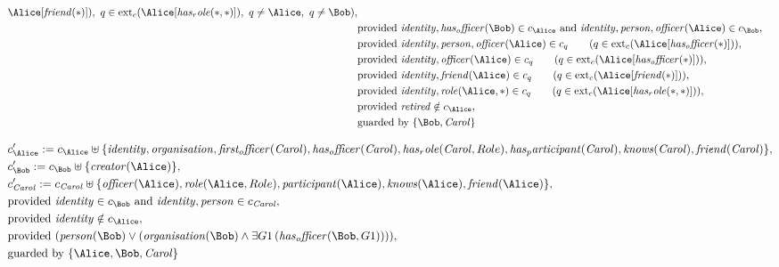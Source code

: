 \begin{align*}
\Alice
[
\mathit{
friend
}
(
\ast
)
]
)
,\ 
q
 \in 
\mathrm{ext}_c(
\Alice
[
\mathit{
has_role
}
(
\ast
,
\ast
)
]
)
,\ 
q \neq 
\Alice
,\ 
q \neq 
\Bob
)
,\\
&
\text{provided } 
\mathit{
identity
}
,
\mathit{
has_officer
}
(
\Bob
)
 \in c_
{
\Alice
}
 \text{ and } 
\mathit{
identity
}
,
\mathit{
person
}
,
\mathit{
officer
}
(
\Alice
)
 \in c_
{
\Bob
}
,\\
&
\text{provided } 
\mathit{
identity
}
,
\mathit{
person
}
,
\mathit{
officer
}
(
\Alice
)
 \in c_
q
 \qquad (
q \in 
\mathrm{ext}_c(
\Alice
[
\mathit{
has_officer
}
(
\ast
)
]
)
)
,\\
&
\text{provided } 
\mathit{
identity
}
,
\mathit{
officer
}
(
\Alice
)
 \in c_
q
 \qquad (
q \in 
\mathrm{ext}_c(
\Alice
[
\mathit{
has_officer
}
(
\ast
)
]
)
)
,\\
&
\text{provided } 
\mathit{
identity
}
,
\mathit{
friend
}
(
\Alice
)
 \in c_
q
 \qquad (
q \in 
\mathrm{ext}_c(
\Alice
[
\mathit{
friend
}
(
\ast
)
]
)
)
,\\
&
\text{provided } 
\mathit{
identity
}
,
\mathit{
role
}
(
\Alice
,
\ast
)
 \in c_
q
 \qquad (
q \in 
\mathrm{ext}_c(
\Alice
[
\mathit{
has_role
}
(
\ast
,
\ast
)
]
)
)
,\\
&
\text{provided } 
\mathit{
retired
}
 \notin c_
{
\Alice
}
,\\
&
\text{guarded by } \{
\Bob
,
\mathit{Carol}
\}
\end{align*}

\begin{align*}
&
c'_
{
\Alice
}
 := 
c_
{
\Alice
}
 \uplus 
\{
\mathit{
identity
}
,
\mathit{
organisation
}
,
\mathit{
first_officer
}
(
\mathit{Carol}
)
,
\mathit{
has_officer
}
(
\mathit{Carol}
)
,
\mathit{
has_role
}
(
\mathit{Carol}
,
Role
)
,
\mathit{
has_participant
}
(
\mathit{Carol}
)
,
\mathit{
knows
}
(
\mathit{Carol}
)
,
\mathit{
friend
}
(
\mathit{Carol}
)
\}
,\\
&
c'_
{
\Bob
}
 := 
c_
{
\Bob
}
 \uplus 
\{
\mathit{
creator
}
(
\Alice
)
\}
,\\
&
c'_
{
\mathit{Carol}
}
 := 
c_
{
\mathit{Carol}
}
 \uplus 
\{
\mathit{
officer
}
(
\Alice
)
,
\mathit{
role
}
(
\Alice
,
Role
)
,
\mathit{
participant
}
(
\Alice
)
,
\mathit{
knows
}
(
\Alice
)
,
\mathit{
friend
}
(
\Alice
)
\}
,\\
&
\text{provided } 
\mathit{
identity
}
 \in c_
{
\Bob
}
 \text{ and } 
\mathit{
identity
}
,
\mathit{
person
}
 \in c_
{
\mathit{Carol}
}
,\\
&
\text{provided } 
\mathit{
identity
}
 \notin c_
{
\Alice
}
,\\
&
\text{provided } 
(
\mathit{
person
}
(
\Bob
)
\lor
(
\mathit{
organisation
}
(
\Bob
)
\land
\exists 
G1
\,(
\mathit{
has_officer
}
(
\Bob
,
G1
)
)
)
)
,\\
&
\text{guarded by } \{
\Alice
,
\Bob
,
\mathit{Carol}
\}
\end{align*}
